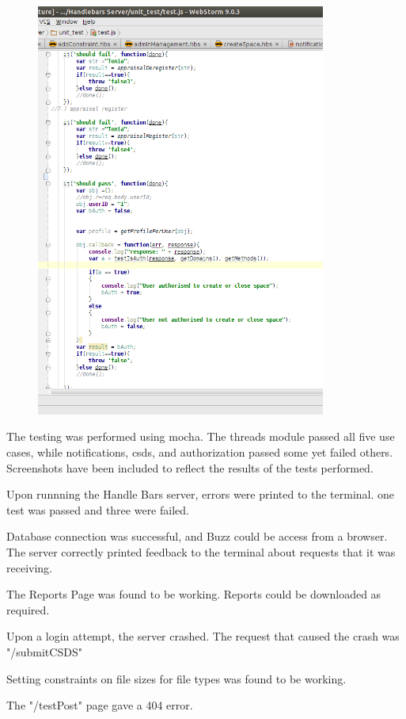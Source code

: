 \documentclass[hidelinks, 12pt, oneside]{article}
\begin{document}
\begin {enumerate}
\begin{figure}[h!]
  \centering
    \includegraphics[width=0.85\textwidth]{TestAuto} 
\end{figure}

The testing was performed using mocha. The threads module passed all five use cases, while notifications, csds, and authorization passed some yet failed others. Screenshots have been included to reflect the results of the tests performed.

Upon runnning the Handle Bars server, errors were printed to the terminal.
one test was passed and three were failed.

Database connection was successful, and Buzz could be access from a browser.
The server correctly printed feedback to the terminal about requests that it was receiving.

The Reports Page was found to be working. Reports could be downloaded as required.

Upon a login attempt, the server crashed. The request that caused the crash was "/submitCSDS"

Setting constraints on file sizes for file types was found to be working.

The "/testPost" page gave a 404 error.


\end {enumerate}
 
\end{document}
